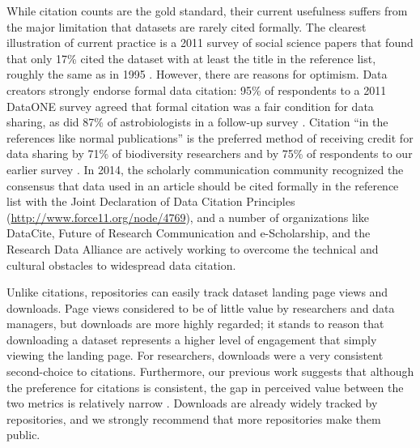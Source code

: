 \documentclass[english]{article}
\begin{document}

While citation counts are the gold standard, their current usefulness suffers from the major limitation that datasets are rarely cited formally.
The clearest illustration of current practice is a 2011 survey of social science papers that found that only 17\% cited the dataset with at least the title in the reference list, roughly the same as in 1995 
\cite{sieber_not_1995, mooney_citing_2011}. 
However, there are reasons for optimism.
Data creators strongly endorse formal data citation: 95\% of respondents to a 2011 DataONE survey agreed that formal citation was a fair condition for data sharing, as did 87\% of astrobiologists in a follow-up survey \cite{tenopir_data_2011, aydinoglu_data_2014}. 
Citation ``in the references like normal publications'' is the preferred method of receiving credit for data sharing by 71\% of biodiversity researchers and by 75\% of respondents to our earlier survey \cite{enke_users_2012, kratz_researcher_2015}.
In 2014, the scholarly communication community recognized the consensus that data used in an article should be cited formally in the reference list with the Joint Declaration of Data Citation Principles (\url{http://www.force11.org/node/4769}), and a number of organizations like DataCite, Future of Research Communication and e-Scholarship, and the Research Data Alliance are actively working to overcome the technical and cultural obstacles to widespread data citation.

Unlike citations, repositories can easily track dataset landing page views and downloads.
Page views considered to be of little value by researchers and data managers, but downloads are more highly regarded; it stands to reason that downloading a dataset represents a higher level of engagement that simply viewing the landing page.
For researchers, downloads were a very consistent second-choice to citations.
Furthermore, our previous work suggests that although the preference for citations is consistent, the gap in perceived value between the two metrics is relatively narrow \cite{kratz_researcher_2015}.
Downloads are already widely tracked by repositories, and we strongly recommend that more repositories make them public.

\end{document}
